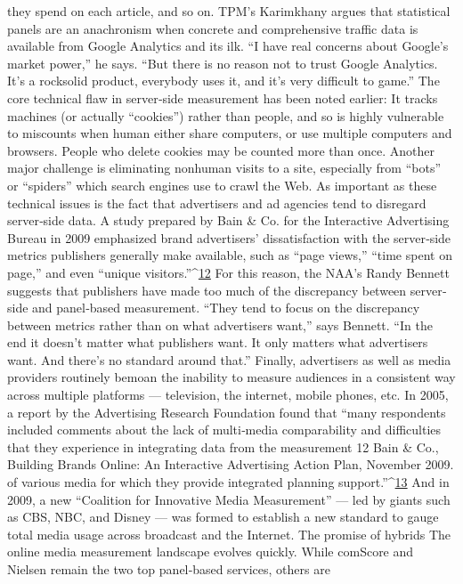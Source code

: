 they spend on each article, and so on.
TPM’s Karimkhany argues that statistical panels are an anachronism
when concrete and comprehensive traffic data is available from Google
Analytics and its ilk. ``I have real concerns about Google’s market power,''
he says. ``But there is no reason not to trust Google Analytics. It’s a rocksolid
product, everybody uses it, and it’s very difficult to game.''
The core technical flaw in server‐side measurement has been noted earlier:
It tracks machines (or actually ``cookies'') rather than people, and so is
highly vulnerable to miscounts when human either share computers, or
use multiple computers and browsers. People who delete cookies may be
counted more than once. Another major challenge is eliminating nonhuman
visits to a site, especially from ``bots'' or ``spiders'' which search
engines use to crawl the Web.
As important as these technical issues is the fact that advertisers and ad
agencies tend to disregard server‐side data. A study prepared by Bain &
Co. for the Interactive Advertising Bureau in 2009 emphasized brand
advertisers’ dissatisfaction with the server‐side metrics publishers
generally make available, such as ``page views,'' ``time spent on page,''
and even ``unique visitors.''^{\href{#endnotes}{12}}
For this reason, the NAA’s Randy Bennett suggests that publishers have
made too much of the discrepancy between server‐side and panel‐based
measurement. ``They tend to focus on the discrepancy between metrics
rather than on what advertisers want,'' says Bennett. ``In the end it doesn’t
matter what publishers want. It only matters what advertisers want. And
there’s no standard around that.''
Finally, advertisers as well as media providers routinely bemoan the
inability to measure audiences in a consistent way across multiple
platforms — television, the internet, mobile phones, etc. In 2005, a report
by the Advertising Research Foundation found that ``many respondents
included comments about the lack of multi‐media comparability and
difficulties that they experience in integrating data from the measurement
12 Bain & Co., Building Brands Online: An Interactive Advertising Action Plan,
November 2009.
of various media for which they provide integrated planning support.''^{\href{#endnotes}{13}}
And in 2009, a new ``Coalition for Innovative Media Measurement'' — led
by giants such as CBS, NBC, and Disney — was formed to establish a new
standard to gauge total media usage across broadcast and the Internet.
The promise of hybrids
The online media measurement landscape evolves quickly. While
comScore and Nielsen remain the two top panel‐based services, others are
